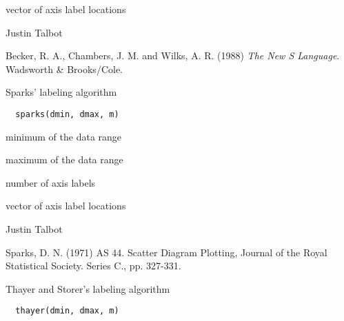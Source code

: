 \documentclass[letterpaper]{book}
\begin{document}
%
\begin{Value}
vector of axis label locations
\end{Value}
%
\begin{Author}\relax
Justin Talbot 
\end{Author}
%
\begin{References}\relax
Becker, R. A., Chambers, J. M. and Wilks, A. R. (1988)
\emph{The New S Language}. Wadsworth \& Brooks/Cole.
\end{References}
%
\begin{Description}\relax
Sparks' labeling algorithm
\end{Description}
%
\begin{Usage}
\begin{verbatim}
  sparks(dmin, dmax, m)
\end{verbatim}
\end{Usage}
%
\begin{Arguments}
\begin{ldescription}
\item[\code{dmin}] minimum of the data range

\item[\code{dmax}] maximum of the data range

\item[\code{m}] number of axis labels
\end{ldescription}
\end{Arguments}
%
\begin{Value}
vector of axis label locations
\end{Value}
%
\begin{Author}\relax
Justin Talbot 
\end{Author}
%
\begin{References}\relax
Sparks, D. N. (1971) AS 44. Scatter Diagram Plotting,
Journal of the Royal Statistical Society. Series C., pp.
327-331.
\end{References}
%
\begin{Description}\relax
Thayer and Storer's labeling algorithm
\end{Description}
%
\begin{Usage}
\begin{verbatim}
  thayer(dmin, dmax, m)
\end{verbatim}
\end{Usage}
\end{document}
